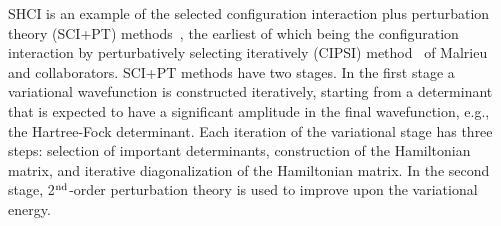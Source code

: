 \documentclass[%
reprint,
 superscriptaddress,
 amsmath,amssymb,
 aps,
]{revtex4-1}
\begin{document}
SHCI is an example of the selected configuration interaction plus perturbation theory (SCI+PT)
methods~\cite{HurMalRan-JCP-73,BuePey-TCA-74,EvaDauMal-CP-83,CimPer-JCoP-87,Har-JCP-91,BytRue-CP-09,KelPerBarGre-JCP-14,CoeMurPat-CPL-14,Eva-JCP-14,SceAppGinCaf-JCoC-16,GarSceLooCaf-JCP-17,LooSceBloGarCafJac-JCP-18,TubLevHaiHeaWha-ARX-18},
the earliest of which being
the configuration interaction by perturbatively selecting iteratively (CIPSI) method~\cite{HurMalRan-JCP-73,EvaDauMal-CP-83} of Malrieu and collaborators.
SCI+PT methods have two stages.  In the first stage a variational wavefunction is constructed iteratively, starting from
a determinant that is expected to have a significant amplitude in the final wavefunction, e.g., the Hartree-Fock determinant.
Each iteration of the variational stage has three steps: selection of important determinants, construction of the Hamiltonian matrix, and
iterative diagonalization of the Hamiltonian matrix.
In the second stage, 2$^{\rm nd}$-order perturbation theory is used to improve upon the variational energy.
\end{document}
